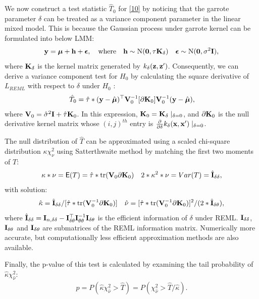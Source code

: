 \documentclass[article]{jss}
\begin{document}
We now construct a test statistic $\hat{T}_0$ for \eqref{10} by noticing that the garrote parameter $\delta$ can be treated as a variance component parameter in the linear mixed model. This is because the Gaussian process under garrote kernel can be formulated into below LMM:
\begin{align}
{\bf y}=\boldsymbol{\mu}+{\bf h}+\boldsymbol{\epsilon}, \quad \mbox{where} \quad {\bf h} \sim \mathrm{N}(\mathbf{0}, \tau {\bf K}_\delta) \quad \boldsymbol{\epsilon} \sim \mathrm{N}(\mathbf{0}, \sigma^2{\bf I}),
\end{align}
where ${\bf K}_\delta$ is the kernel matrix generated by $k_{\delta}({\bf z}, {\bf z}')$. Consequently, we can derive a variance component test for $H_0$ by calculating the square derivative of $L_{REML}$ with respect to $\delta$ under $H_0$ \citep{lin_variance_1997}:
\begin{align}
\hat{T}_0=\hat{\tau}*({\bf y}-\hat{\boldsymbol{\mu}})^\top {\bf V}_0^{-1}[\partial {\bf K}_0]{\bf V}_0^{-1}({\bf y}-\hat{\boldsymbol{\mu}}),\label{11}
\end{align}
where ${\bf V}_0=\hat{\sigma}^2{\bf I}+\hat{\tau}{\bf K}_0$. In this expression, ${\bf K}_0={\bf K}_\delta \mid_{\delta=0}$, and $\partial {\bf K}_0$ is the null derivative kernel matrix whose $(i, j)^{th}$ entry is $\frac{\partial }{\partial \delta}k_\delta({\bf x}, {\bf x}') \mid_{\delta=0}$.

The null distribution of $\hat{T}$ can be approximated using a scaled chi-square distribution $\kappa \chi_\nu^2$ using Satterthwaite method by matching the first two moments of $T$:
\begin{align*}
\kappa * \nu=\mathsf{E}(T)=\hat{\tau} * \mbox{tr}({\bf V}_0\partial {\bf K}_0)
 \quad 2*\kappa^2*\nu=Var(T)=\hat{{\bf I}}_{\delta\delta},
\end{align*}
with solution:
\begin{align*}
\hat{\kappa}=\hat{{\bf I}}_{\delta\delta}/[\hat{\tau}*\mbox{tr}({\bf V}_0^{-1}\partial {\bf K}_0)] \quad \hat{\nu}=[\hat{\tau}*\mbox{tr}({\bf V}_0^{-1}\partial {\bf K}_0)]^2/(2*\hat{{\bf I}}_{\delta\theta}),
\end{align*}
where $\hat{{\bf I}}_{\delta\delta}={\bf I}_{n, \delta\delta}-{\bf I}_{\delta\theta}^\top {\bf I}_{\theta\theta}^{-1}{\bf I}_{\delta\theta}$ is the efficient information of $\delta$ under REML. ${\bf I}_{\delta\delta}$, ${\bf I}_{\theta\theta}$ and ${\bf I}_{\delta\theta}$ are submatrices of the REML information matrix. 
Numerically more accurate, but computationally less efficient approximation methods are also available.

Finally, the p-value of this test is calculated by examining the tail probability of $\hat{\kappa} \chi_{\hat{\nu}}^2$:
\begin{align*}
p=P(\hat{\kappa} \chi_{\hat{\nu}}^2>\hat{T})=P(\chi_{\hat{\nu}}^2>\hat{T}/\hat{\kappa}).
\end{align*}
\end{document}
